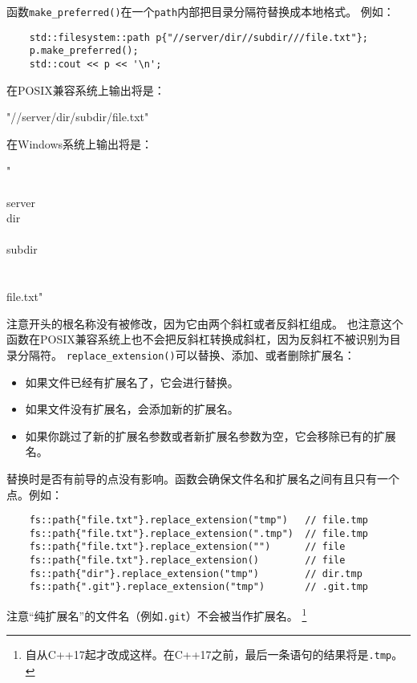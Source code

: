 函数\texttt{make\_preferred()}在一个\texttt{path}内部把目录分隔符替换成本地格式。
例如：
\begin{lstlisting}
    std::filesystem::path p{"//server/dir//subdir///file.txt"};
    p.make_preferred();
    std::cout << p << '\n';
\end{lstlisting}
在POSIX兼容系统上输出将是：
\begin{blacklisting}
    "//server/dir/subdir/file.txt"
\end{blacklisting}
在Windows系统上输出将是：
\begin{blacklisting}
    "\\\\server\\dir\\\\subdir\\\\\\file.txt"
\end{blacklisting}
注意开头的根名称没有被修改，因为它由两个斜杠或者反斜杠组成。
也注意这个函数在POSIX兼容系统上也不会把反斜杠转换成斜杠，因为反斜杠不被识别为目录分隔符。
\texttt{replace\_extension()}可以替换、添加、或者删除扩展名：
\begin{itemize}
    \item 如果文件已经有扩展名了，它会进行替换。
    \item 如果文件没有扩展名，会添加新的扩展名。
    \item 如果你跳过了新的扩展名参数或者新扩展名参数为空，它会移除已有的扩展名。
\end{itemize}
替换时是否有前导的点没有影响。函数会确保文件名和扩展名之间有且只有一个点。例如：
\begin{lstlisting}
    fs::path{"file.txt"}.replace_extension("tmp")   // file.tmp
    fs::path{"file.txt"}.replace_extension(".tmp")  // file.tmp
    fs::path{"file.txt"}.replace_extension("")      // file
    fs::path{"file.txt"}.replace_extension()        // file
    fs::path{"dir"}.replace_extension("tmp")        // dir.tmp
    fs::path{".git"}.replace_extension("tmp")       // .git.tmp
\end{lstlisting}
注意“纯扩展名”的文件名（例如\texttt{.git}）不会被当作扩展名。
\footnote{自从C++17起才改成这样。在C++17之前，最后一条语句的结果将是\texttt{.tmp}。}

